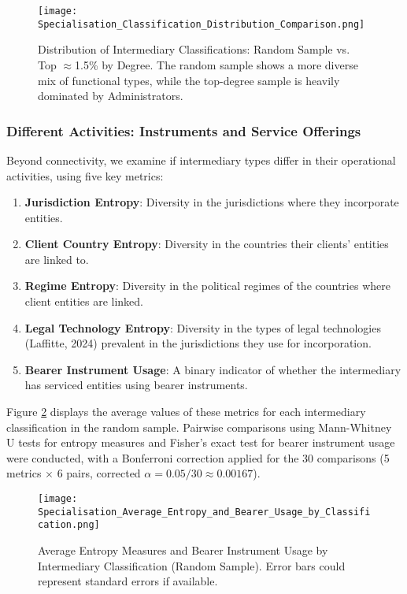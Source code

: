 \begin{figure}[htbp]
    \centering
    \texttt{[image: Specialisation\_Classification\_Distribution\_Comparison.png]}
    \caption{Distribution of Intermediary Classifications: Random Sample vs. Top $\approx$1.5\% by Degree. The random sample shows a more diverse mix of functional types, while the top-degree sample is heavily dominated by Administrators.}
    \label{fig:specialisation_classification_distribution}
\end{figure}

\subsubsection{Different Activities: Instruments and Service Offerings}
\label{subsubsec:activities_functional}

Beyond connectivity, we examine if intermediary types differ in their operational activities, using five key metrics:
\begin{enumerate}
    \item \textbf{Jurisdiction Entropy}: Diversity in the jurisdictions where they incorporate entities.
    \item \textbf{Client Country Entropy}: Diversity in the countries their clients' entities are linked to.
    \item \textbf{Regime Entropy}: Diversity in the political regimes of the countries where client entities are linked.
    \item \textbf{Legal Technology Entropy}: Diversity in the types of legal technologies (Laffitte, 2024) prevalent in the jurisdictions they use for incorporation.
    \item \textbf{Bearer Instrument Usage}: A binary indicator of whether the intermediary has serviced entities using bearer instruments.
\end{enumerate}

Figure \ref{fig:specialisation_average_entropy_bearer} displays the average values of these metrics for each intermediary classification in the random sample. Pairwise comparisons using Mann-Whitney U tests for entropy measures and Fisher's exact test for bearer instrument usage were conducted, with a Bonferroni correction applied for the 30 comparisons (5 metrics $\times$ 6 pairs, corrected $\alpha = 0.05/30 \approx 0.00167$).

\begin{figure}[htbp]
    \centering
    \texttt{[image: Specialisation\_Average\_Entropy\_and\_Bearer\_Usage\_by\_Classification.png]}
    \caption{Average Entropy Measures and Bearer Instrument Usage by Intermediary Classification (Random Sample). Error bars could represent standard errors if available.}
    \label{fig:specialisation_average_entropy_bearer}
\end{figure}

